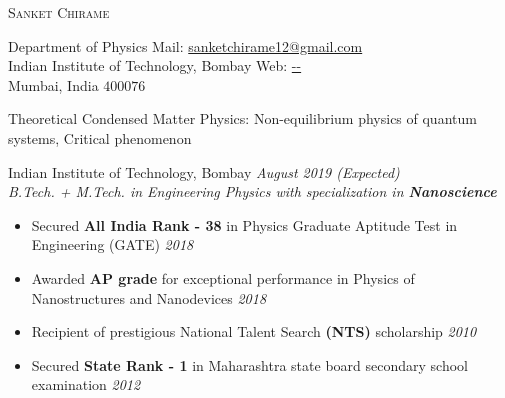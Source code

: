 \documentclass[10pt]{article}%
\newcommand{\xfilll}[2][1ex]{
\dimen0=#2\advance\dimen0 by #1
\leaders\hrule height \dimen0 depth -#1\hfill}
\begin{document}
\begin{center}
\huge{\textsc{Sanket Chirame}}\\
\vspace{1.5mm}
\end{center}
Department of Physics  \hfill Mail: \href{mailto:sanketchirame12@gmail.com}{sanketchirame12@gmail.com}\\
Indian Institute of Technology, Bombay \hfill Web: \url{--}\\
Mumbai, India $400 076$
\vspace{2mm}
{%
{}
\vspace{-2mm}
Theoretical Condensed Matter Physics: Non-equilibrium physics of quantum systems, Critical phenomenon
\vspace{-1mm}
Indian Institute of Technology, Bombay \hfill \textit{August 2019 (Expected)}\\
{\em B.Tech. + M.Tech. in Engineering Physics with specialization in \textbf{Nanoscience}}

\vspace{-4mm}
\begin{itemize}
 \setlength\itemsep{0.01em}

\item Secured \textbf{All India Rank - 38} in Physics Graduate Aptitude Test in Engineering (GATE) \hfill\textit{2018} 
\item Awarded \textbf{AP grade} for exceptional performance in Physics of Nanostructures and Nanodevices \hfill\textit{2018}
\item Recipient of prestigious National Talent Search \textbf{(NTS)} scholarship  \hfill\textit{2010}
\item Secured \textbf{State Rank - 1} in Maharashtra state board secondary school examination \hfill\textit{2012}


\end{itemize}}
\end{document}
